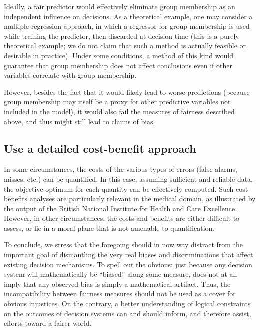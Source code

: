 \documentclass[twocolumn]{article}
\begin{document}
Ideally, a fair predictor would
effectively eliminate group membership as an independent influence on decisions. As a theoretical example, one may consider a multiple-regression approach, in which a
regressor for group membership is used while training the predictor, then
discarded at decision time (this is a purely theoretical example; we do not
claim that such a method is actually feasible or desirable in practice). Under some conditions, a method of this
kind would guarantee that group membership does not affect conclusions
even if other variables correlate with group membership. 

However, besides the fact that it would likely lead to worse
predictions (because group membership may itself be a proxy for other
predictive variables not included in the model), it would also fail the
measures of fairness described above, and thus might still lead to claims of bias. 

\subsection{Use a detailed cost-benefit approach}

In some circumstances, the costs of the various types of errors (false alarms,
misses, etc.) can be quantified. In this case, assuming sufficient and
reliable data, the objective optimum for each quantity can be effectively
computed. Such cost-benefits analyses are particularly relevant in the medical
domain, as illustrated by the output of the British National Institute for
Health and Care Excellence. However, in other circumstances, the costs and
benefits are either difficult to assess, or lie in a moral plane that is not
amenable to quantification.

To conclude, we stress that the foregoing should in now way distract from the
important goal of dismantling the very real biases and discriminations that affect
existing decision mechanisms. To spell out the obvious: just because any
decision system will mathematically be ``biased'' along some measure, does not
at all imply that any observed bias is simply a mathematical artifact. Thus, the incompatibility between fairness measures should not be used as a cover for obvious injustices. On the contrary, a better
understanding of logical constraints on the outcomes of decision systems can and should
inform, and therefore assist, efforts toward a fairer world. 



{}

\end{document}
